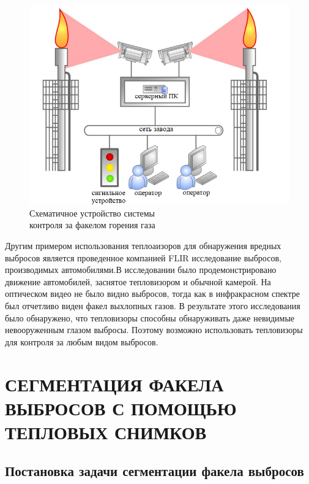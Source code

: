 \documentclass[14pt, a4paper]{extreport}
\begin{document}
	\begin{figure}[ht!]
		\centering
		\includegraphics[width = 13cm]{image/chapter_1/controlGasSystem}	
		\caption{Схематичное устройство системы\\контроля за факелом горения газа}
		\label{fig:controlGasSystem}
	\end{figure}

	Другим примером использования теплоаизоров для обнаружения вредных выбросов является проведенное компанией FLIR исследование выбросов, производимых автомобилями.В исследовании было продемонстрировано движение автомобилей, заснятое тепловизором и обычной камерой. На оптическом видео не было видно выбросов, тогда как в инфракрасном спектре был отчетливо виден факел выхлопных газов. В результате этого исследования было обнаружено, что тепловизоры способны обнаруживать даже невидимые невооруженным глазом выбросы. Поэтому возможно использовать тепловизоры для контроля за любым видом выбросов. 
	
\chapter[\vspace*{-0.22cm}СЕГМЕНТАЦИЯ ФАКЕЛА ВЫБРОСОВ С ПОМОЩЬЮ \\ \hspace*{-0.35cm}ТЕПЛОВЫХ СНИМКОВ]{СЕГМЕНТАЦИЯ ФАКЕЛА ВЫБРОСОВ С ПОМОЩЬЮ ТЕПЛОВЫХ СНИМКОВ}
\section{Постановка задачи сегментации факела выбросов}
\end{document}
